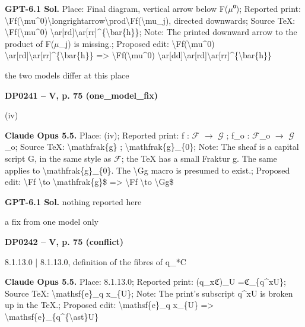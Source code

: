 \textbf{GPT-6.1 Sol.} Place: Final diagram, vertical arrow below F(\ensuremath{\mu}⁰); Reported print: \textbackslash{}Ff(\textbackslash{}mu\textasciicircum{}0)\textbackslash{}longrightarrow\textbackslash{}prod\textbackslash{}Ff(\textbackslash{}mu\_j), directed downwards; Source TeX: \textbackslash{}Ff(\textbackslash{}mu\textasciicircum{}0) \textbackslash{}ar[rd]\textbackslash{}ar[rr]\textasciicircum{}\{\textbackslash{}bar\{h\}\}; Note: The printed downward arrow to the product of F(\ensuremath{\mu}\_j) is missing.; Proposed edit: \textbackslash{}Ff(\textbackslash{}mu\textasciicircum{}0) \textbackslash{}ar[rd]\textbackslash{}ar[rr]\textasciicircum{}\{\textbackslash{}bar\{h\}\} =\allowbreak > \textbackslash{}Ff(\textbackslash{}mu\textasciicircum{}0) \textbackslash{}ar[dd]\textbackslash{}ar[rd]\textbackslash{}ar[rr]\textasciicircum{}\{\textbackslash{}bar\{h\}\}\par
the two models differ at this place\par
\par\noindent\hypertarget{DP0241}{}\textbf{DP0241 -- V, p. 75 (one\_model\_fix)}\par
(iv)\par
\textbf{Claude Opus 5.5.} Place: (iv); Reported print: f : \ensuremath{\mathcal{F}} \ensuremath{\longrightarrow} \ensuremath{𝒢} ; f\_o : \ensuremath{\mathcal{F}}\_o \ensuremath{\longrightarrow} \ensuremath{𝒢}\_o; Source TeX: \textbackslash{}mathfrak\{g\} ; \textbackslash{}mathfrak\{g\}\_\{0\}; Note: The sheaf is a capital script G, in the same style as \ensuremath{\mathcal{F}}; the TeX has a small Fraktur g. The same applies to \textbackslash{}mathfrak\{g\}\_\{0\}. The \textbackslash{}Gg macro is presumed to exist.; Proposed edit: \textbackslash{}Ff \textbackslash{}to \textbackslash{}mathfrak\{g\}\$ =\allowbreak > \textbackslash{}Ff \textbackslash{}to \textbackslash{}Gg\$\par
\textbf{GPT-6.1 Sol.} nothing reported here\par
a fix from one model only\par
\par\noindent\hypertarget{DP0242}{}\textbf{DP0242 -- V, p. 75 (conflict)}\par
8.1.13.0 | 8.1.13.0, definition of the fibres of q\_*C\par
\textbf{Claude Opus 5.5.} Place: 8.1.13.0; Reported print: (q\_x\ensuremath{\mathfrak{C}})\_U =\allowbreak  \ensuremath{\mathfrak{C}}\_\{q\textasciicircum{}xU\}; Source TeX: \textbackslash{}mathsf\{e\}\_q x\_\{U\}; Note: The print's subscript q\textasciicircum{}xU is broken up in the TeX.; Proposed edit: \textbackslash{}mathsf\{e\}\_q x\_\{U\} =\allowbreak > \textbackslash{}mathsf\{e\}\_\{q\textasciicircum{}\{\textbackslash{}ast\}U\}\par

